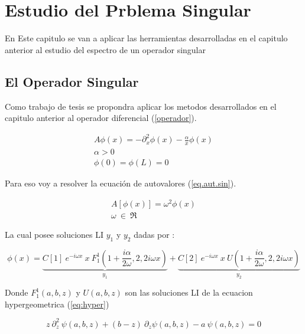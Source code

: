 \chapter{Estudio del Prblema Singular}

    En Este capitulo se van a aplicar las herramientas desarrolladas en el capitulo anterior al estudio del espectro de un operador singular

\section{El Operador Singular}

Como trabajo de tesis se propondra aplicar los metodos desarrollados en el capitulo anterior al operador diferencial (\ref{operador}).

\begin{equation}
\begin{array}{c}
    A \phi (x) = - \partial ^2 _x  \phi(x) - \frac{\alpha}{x} \phi(x) \\
    \alpha > 0 \\ 
    \phi(0) = \phi(L) = 0 
\end{array}
\label{operador}
\end{equation}

Para eso voy a resolver la ecuación de autovalores (\ref{eq.aut.sin}).

\begin{equation}
\begin{array}{c}
    A [ \phi (x) ] =  \omega ^2 \phi (x) \\ 
    \omega \ \in \ \mathfrak{R}
\end{array}
\label{eq.aut.sin}
\end{equation}

La cual posee soluciones LI $ y_1 $ y $ y_2 $ dadas por :

\begin{equation}
    \phi (x) = 
    \underbrace{
    C[1] \ e ^{-i \omega x} \ x \ F _{1} ^{1} (1+\frac{i \alpha}{2 \omega},2,2 i \omega x) } _ {y_1}
    + \underbrace{C[2] \ e^{-i \omega x } \ x \ U (1+\frac{i \alpha}{2 \omega},2,2 i \omega x) } _{y_2}
\end{equation}

Donde $F _1 ^1(a,b,z)$ y $ U(a,b,z)$ son las soluciones LI de la ecuacion hypergeometrica (\ref{eq:hyper})

\begin{equation}
    z \ \partial ^2 _z \ \psi (a,b,z) + (b-z) \
    \partial _z \psi (a,b,z)
    -a \ \psi (a,b,z) = 0
\label{eq:hyper}
\end{equation}

